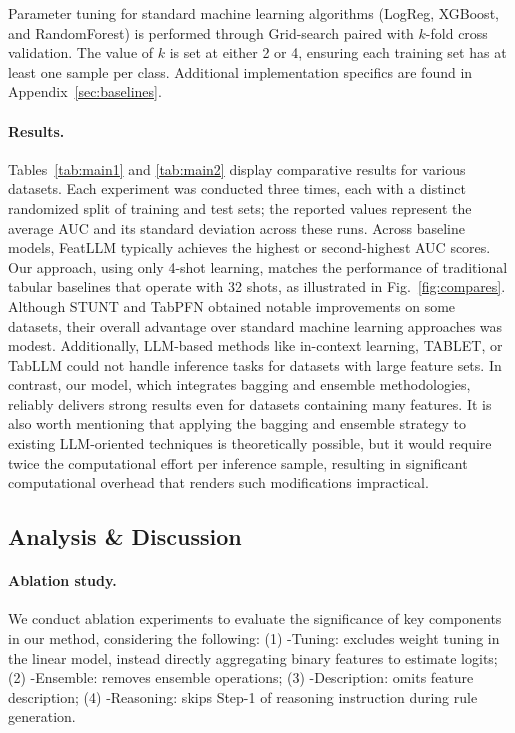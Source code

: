 Parameter tuning for standard machine learning algorithms (LogReg, XGBoost, and RandomForest) is performed through Grid-search paired with $k$-fold cross validation. The value of $k$ is set at either 2 or 4, ensuring each training set has at least one sample per class. Additional implementation specifics are found in Appendix~\ref{sec:baselines}.

\vspace*{-0.12in}
\paragraph{Results.}
Tables~\ref{tab:main1} and \ref{tab:main2} display comparative results for various datasets. Each experiment was conducted three times, each with a distinct randomized split of training and test sets; the reported values represent the average AUC and its standard deviation across these runs. Across baseline models, \textsf{FeatLLM} typically achieves the highest or second-highest AUC scores. Our approach, using only 4-shot learning, matches the performance of traditional tabular baselines that operate with 32 shots, as illustrated in Fig.~\ref{fig:compares}. Although STUNT and TabPFN obtained notable improvements on some datasets, their overall advantage over standard machine learning approaches was modest. Additionally, LLM-based methods like in-context learning, TABLET, or TabLLM could not handle inference tasks for datasets with large feature sets. In contrast, our model, which integrates bagging and ensemble methodologies, reliably delivers strong results even for datasets containing many features. It is also worth mentioning that applying the bagging and ensemble strategy to existing LLM-oriented techniques is theoretically possible, but it would require twice the computational effort per inference sample, resulting in significant computational overhead that renders such modifications impractical.

\subsection{Analysis \& Discussion}
\label{sec:analysis}
\paragraph{Ablation study.} We conduct ablation experiments to evaluate the significance of key components in our method, considering the following: (1) \textsf{-Tuning}: excludes weight tuning in the linear model, instead directly aggregating binary features to estimate logits; (2) \textsf{-Ensemble}: removes ensemble operations; (3) \textsf{-Description}: omits feature description; (4) \textsf{-Reasoning}: skips Step-1 of reasoning instruction during rule generation.

